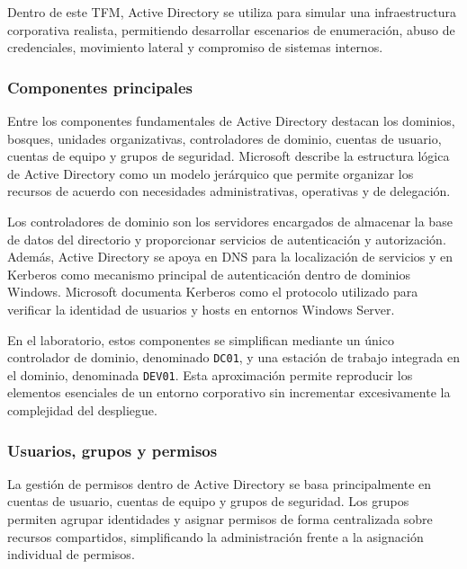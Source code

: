Dentro de este TFM, Active Directory se utiliza para simular una infraestructura corporativa realista, permitiendo desarrollar escenarios de enumeración, abuso de credenciales, movimiento lateral y compromiso de sistemas internos.


\subsubsection{Componentes principales}

Entre los componentes fundamentales de Active Directory destacan los dominios, bosques, unidades organizativas, controladores de dominio, cuentas de usuario, cuentas de equipo y grupos de seguridad. Microsoft describe la estructura lógica de Active Directory como un modelo jerárquico que permite organizar los recursos de acuerdo con necesidades administrativas, operativas y de delegación.

Los controladores de dominio son los servidores encargados de almacenar la base de datos del directorio y proporcionar servicios de autenticación y autorización. Además, Active Directory se apoya en DNS para la localización de servicios y en Kerberos como mecanismo principal de autenticación dentro de dominios Windows. Microsoft documenta Kerberos como el protocolo utilizado para verificar la identidad de usuarios y hosts en entornos Windows Server.

En el laboratorio, estos componentes se simplifican mediante un único controlador de dominio, denominado \texttt{DC01}, y una estación de trabajo integrada en el dominio, denominada \texttt{DEV01}. Esta aproximación permite reproducir los elementos esenciales de un entorno corporativo sin incrementar excesivamente la complejidad del despliegue.


\subsubsection{Usuarios, grupos y permisos}

La gestión de permisos dentro de Active Directory se basa principalmente en cuentas de usuario, cuentas de equipo y grupos de seguridad. Los grupos permiten agrupar identidades y asignar permisos de forma centralizada sobre recursos compartidos, simplificando la administración frente a la asignación individual de permisos.

